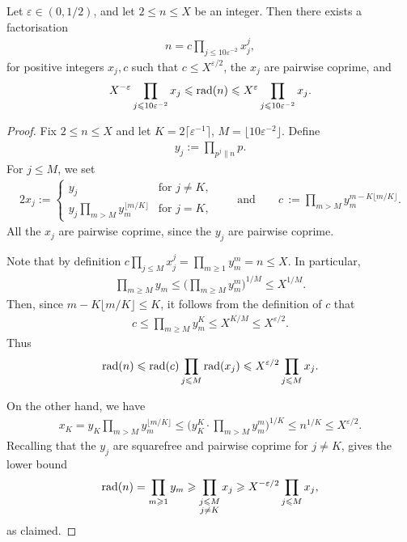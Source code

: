 \begin{lemma}\label{lem:DiophantineFactor}
Let $\varepsilon\in (0,1/2)$, and let $2\leq n\leq X$ be an integer. Then there exists a factorisation
\begin{align*}
n=c\prod_{j\leq 10\varepsilon^{-2}}x_j^{j},
\end{align*}
for positive integers $x_j,c$ such that $c\leq X^{\varepsilon/2}$, the $x_j$ are pairwise coprime, and \begin{align*}
X^{-\varepsilon}\prod_{j\leqslant 10\varepsilon^{-2}}x_j \leqslant \operatorname{rad}(n) \leqslant X^{\varepsilon}\prod_{j\leqslant 10\varepsilon^{-2}}x_j.
\end{align*}
\end{lemma}
\begin{proof}
  Fix $2\le n\le X$ and let $K=2\lceil \varepsilon^{-1}\rceil$, $M=\lfloor 10\varepsilon^{-2}\rfloor$. Define
\begin{align*}
y_j:=\prod_{p^j\|n} p.
\end{align*}
For $j\leq M$, we set
\begin{alignat*}{2}
x_j:=\begin{cases}y_j & \text{for $j\neq K$},\\
y_j\prod_{m>M}y_m^{\lfloor m/K\rfloor} & \text{for $j=K$},
\end{cases}\qquad\text{and}\qquad
c\,:=\prod_{m>M}y_m^{m-K\lfloor m/K\rfloor}.
\end{alignat*}
All the $x_j$ are pairwise coprime, since the $y_j$ are pairwise coprime.


Note that by definition $c\prod_{j\leq M}x_j^j=\prod_{m\geq 1}y_m^m=n\leq X$. In particular,
\begin{align*}
\prod_{m\geq M}y_m\leq \Big(\prod_{m\geq M}y_m^{m}\Big)^{1/M}\leq X^{1/M}.
\end{align*}
Then, since $m-K\lfloor m/K\rfloor \le K$, it follows from the definition of $c$ that
\begin{align*}
c\leq \prod_{m\geq M}y_m^K\leq X^{K/M}\leq X^{\varepsilon/2}.
\end{align*}
Thus
\[
\operatorname{rad}(n)\leqslant \operatorname{rad}(c)\prod_{j\leqslant M}\operatorname{rad}(x_j)\leqslant X^{\varepsilon/2} \prod_{j\leqslant M} x_j.
\]

On the other hand, we have
\begin{align*}
x_K = y_K\prod_{m> M}y_m^{\lfloor m/K\rfloor}\leq \Big(y_K^K\cdot\prod_{m> M}y_m^m\Big)^{1/K}\leq n^{1/K}\leq X^{\varepsilon/2}.
\end{align*}
Recalling that the $y_j$ are squarefree and pairwise coprime for $j\neq K$, gives the lower bound
\[
\operatorname{rad}(n)=\prod_{m\geqslant 1}y_m \geqslant \prod_{\substack{j\leqslant M\\j\neq K}}x_j\geqslant X^{-\varepsilon/2}\prod_{j\leqslant M}x_j,
\]
as claimed.
\end{proof}

